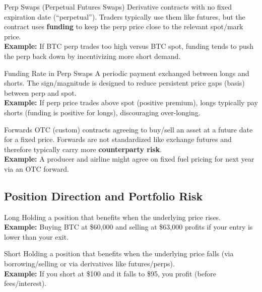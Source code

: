 \begin{keyterm}{Perp Swaps (Perpetual Futures Swaps)}
Derivative contracts with no fixed expiration date (``perpetual''). Traders typically
use them like futures, but the contract uses \textbf{funding} to keep the perp price close
to the relevant spot/mark price.
\\\textbf{Example:} If BTC perp trades too high versus BTC spot, funding tends to push the perp
back down by incentivizing more short demand.
\end{keyterm}

\begin{keyterm}{Funding Rate in Perp Swaps}
A periodic payment exchanged between longs and shorts. The sign/magnitude is designed to
reduce persistent price gaps (basis) between perp and spot.
\\\textbf{Example:} If perp price trades above spot (positive premium), longs typically pay
shorts (funding is positive for longs), discouraging over-longing.
\end{keyterm}

\begin{keyterm}{Forwards}
OTC (custom) contracts agreeing to buy/sell an asset at a future date for a fixed price.
Forwards are not standardized like exchange futures and therefore typically carry more
\textbf{counterparty risk}.
\\\textbf{Example:} A producer and airline might agree on fixed fuel pricing for next year
via an OTC forward.
\end{keyterm}

\subsection{Position Direction and Portfolio Risk}

\begin{keyterm}{Long}
Holding a position that benefits when the underlying price rises.
\\\textbf{Example:} Buying BTC at \$60{,}000 and selling at \$63{,}000 profits if your entry is lower
than your exit.
\end{keyterm}

\begin{keyterm}{Short}
Holding a position that benefits when the underlying price falls (via borrowing/selling
or via derivatives like futures/perps).
\\\textbf{Example:} If you short at \$100 and it falls to \$95, you profit (before fees/interest).
\end{keyterm}

